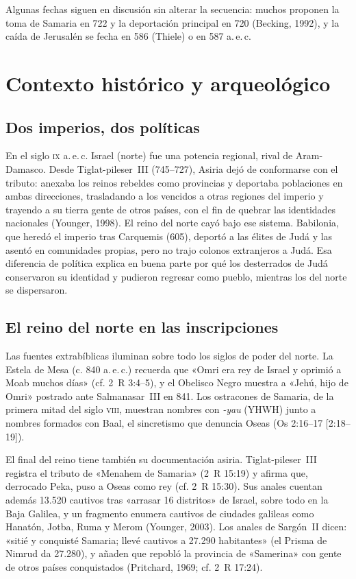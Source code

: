 Algunas fechas siguen en discusión sin alterar la secuencia: muchos proponen la toma de Samaria en 722 y la deportación principal en 720 (Becking, 1992), y la caída de Jerusalén se fecha en 586 (Thiele) o en 587 a.\,e.\,c.

\section{Contexto histórico y arqueológico}

\subsection{Dos imperios, dos políticas}
En el siglo \textsc{ix} a.\,e.\,c. Israel (norte) fue una potencia regional, rival de Aram-Damasco. Desde Tiglat-pileser~III (745--727), Asiria dejó de conformarse con el tributo: anexaba los reinos rebeldes como provincias y deportaba poblaciones en ambas direcciones, trasladando a los vencidos a otras regiones del imperio y trayendo a su tierra gente de otros países, con el fin de quebrar las identidades nacionales (Younger, 1998). El reino del norte cayó bajo ese sistema. Babilonia, que heredó el imperio tras Carquemis (605), deportó a las élites de Judá y las asentó en comunidades propias, pero no trajo colonos extranjeros a Judá. Esa diferencia de política explica en buena parte por qué los desterrados de Judá conservaron su identidad y pudieron regresar como pueblo, mientras los del norte se dispersaron.

\subsection{El reino del norte en las inscripciones}
Las fuentes extrabíblicas iluminan sobre todo los siglos de poder del norte. La Estela de Mesa (c. 840 a.\,e.\,c.) recuerda que «Omri era rey de Israel y oprimió a Moab muchos días» (cf. 2~R 3:4--5), y el Obelisco Negro muestra a «Jehú, hijo de Omri» postrado ante Salmanasar~III en 841. Los ostracones de Samaria, de la primera mitad del siglo \textsc{viii}, muestran nombres con \emph{-yau} (YHWH) junto a nombres formados con Baal, el sincretismo que denuncia Oseas (Os 2:16--17 [2:18--19]).



El final del reino tiene también su documentación asiria. Tiglat-pileser~III registra el tributo de «Menahem de Samaria» (2~R 15:19) y afirma que, derrocado Peka, puso a Oseas como rey (cf. 2~R 15:30). Sus anales cuentan además 13.520 cautivos tras «arrasar 16 distritos» de Israel, sobre todo en la Baja Galilea, y un fragmento enumera cautivos de ciudades galileas como Hanatón, Jotba, Ruma y Merom (Younger, 2003). Los anales de Sargón~II dicen: «sitié y conquisté Samaria; llevé cautivos a 27.290 habitantes» (el Prisma de Nimrud da 27.280), y añaden que repobló la provincia de «Samerina» con gente de otros países conquistados (Pritchard, 1969; cf. 2~R 17:24).

